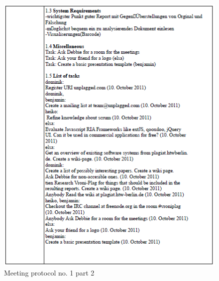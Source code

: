 \begin{appendix}
\begin{figure}
  \centering
    \includegraphics[width=\textwidth]{images/a_meetings/meeting_01b.png}
  \caption{Meeting protocol no. 1 part 2}
  \label{fig:meeting protocol no. 1 part 2}
\end{figure}


\end{appendix}

